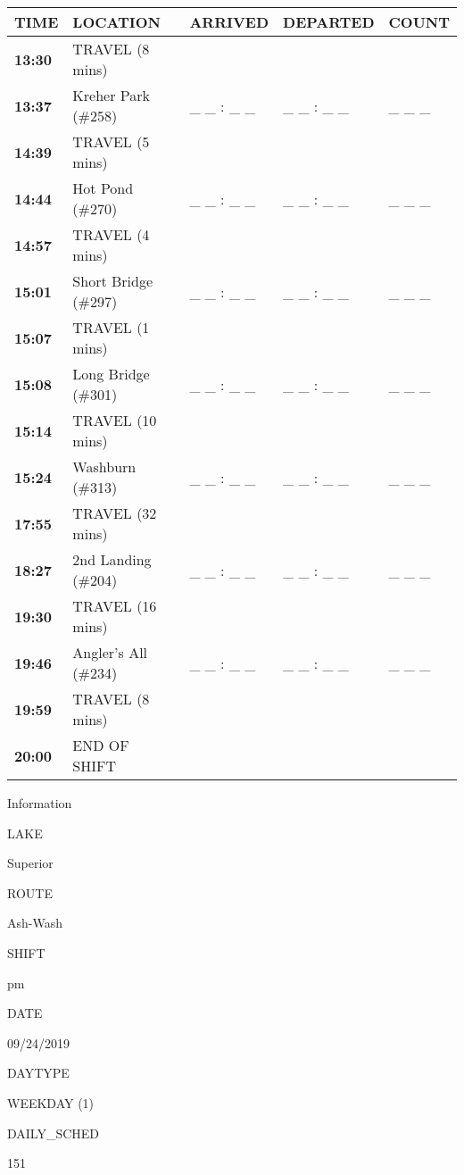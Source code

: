 \documentclass[]{article}
\begin{document}
\begin{tabular}{>{\bfseries}lllll}
\toprule
\textbf{TIME} & \textbf{LOCATION} & \textbf{ARRIVED} & \textbf{DEPARTED} & \textbf{COUNT}\\
\midrule
13:30 & TRAVEL (8 mins) &  &  & \\
13:37 & Kreher Park (\#258) & \_ \_ : \_ \_ & \_ \_ : \_ \_ & \_ \_ \_\\
14:39 & TRAVEL (5 mins) &  &  & \\
14:44 & Hot Pond (\#270) & \_ \_ : \_ \_ & \_ \_ : \_ \_ & \_ \_ \_\\
14:57 & TRAVEL (4 mins) &  &  & \\
15:01 & Short Bridge (\#297) & \_ \_ : \_ \_ & \_ \_ : \_ \_ & \_ \_ \_\\
15:07 & TRAVEL (1 mins) &  &  & \\
15:08 & Long Bridge (\#301) & \_ \_ : \_ \_ & \_ \_ : \_ \_ & \_ \_ \_\\
15:14 & TRAVEL (10 mins) &  &  & \\
15:24 & Washburn (\#313) & \_ \_ : \_ \_ & \_ \_ : \_ \_ & \_ \_ \_\\
17:55 & TRAVEL (32 mins) &  &  & \\
18:27 & 2nd Landing (\#204) & \_ \_ : \_ \_ & \_ \_ : \_ \_ & \_ \_ \_\\
19:30 & TRAVEL (16 mins) &  &  & \\
19:46 & Angler's All (\#234) & \_ \_ : \_ \_ & \_ \_ : \_ \_ & \_ \_ \_\\
19:59 & TRAVEL (8 mins) &  &  & \\
20:00 & END OF SHIFT &  &  & \\
\bottomrule
\end{tabular}\newpage

Information

LAKE

Superior

ROUTE

Ash-Wash

SHIFT

pm

DATE

09/24/2019

DAYTYPE

WEEKDAY (1)

DAILY\_SCHED

151

\vspace{24pt}
\end{document}
